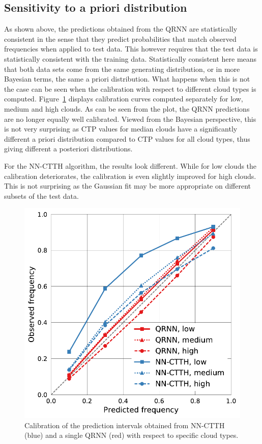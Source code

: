 \documentclass[journal abbreviation, manuscript]{copernicus}
\begin{document}
\subsection{Sensitivity to a priori distribution}

As shown above, the predictions obtained from the QRNN are statistically
consistent in the sense that they predict probabilities that match observed
frequencies when applied to test data. This however requires that the test data
is statistically consistent with the training data. Statistically consistent
here means that both data sets come from the same generating distribution, or in
more Bayesian terms, the same a priori distribution. What happens when this is
not the case can be seen when the calibration with respect to different cloud
types is computed. Figure~\ref{fig:calibration_cloud_type} displays calibration
curves computed separately for low, medium and high clouds. As can be seen from the plot, the QRNN
predictions are no longer equally well calibrated. Viewed from the Bayesian
perspective, this is not very surprising as CTP values for median clouds have a
significantly different a priori distribution compared to CTP values for all
cloud types, thus giving different a posteriori distributions.

 For the NN-CTTH algorithm, the results look different. While for low clouds
the calibration deteriorates, the calibration is even slightly improved for
high clouds. This is not surprising as the Gaussian fit may be more
appropriate on different subsets of the test data. 

  \begin{figure}[hbpt!]
    \centering
    \includegraphics[width = 0.5\linewidth]{../plots/fig13}
    \caption{Calibration of the prediction intervals obtained from NN-CTTH (blue) and
      a single QRNN (red) with respect to specific cloud types.}
    \label{fig:calibration_cloud_type}
  \end{figure}
\end{document}

